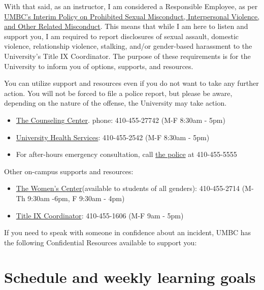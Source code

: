 \documentclass[11pt]{article}
\begin{document}
With that said, as an instructor, I am considered a Responsible Employee, as per \href{https://oei.umbc.edu/umbcs-policy-on-prohibited-sexual-misconduct-interpersonal-violence-and-other-related-misconduct/}{UMBC's Interim Policy on Prohibited Sexual Misconduct, Interpersonal Violence, and Other Related Misconduct}. This means that while I am here to listen and support you, I am required to report disclosures of sexual assault, domestic violence, relationship violence, stalking, and/or gender-based harassment to the University's Title IX Coordinator. The purpose of these requirements is for the University to inform you of options, supports, and resources.

You can utilize support and resources even if you do not want to take any further action. You will not be forced to file a police report, but please be aware, depending on the nature of the offense, the University may take action.
\begin{itemize}
	\item \href{https://counseling.umbc.edu/}{The Counseling Center}. phone: 410-455-27742 (M-F 8:30am - 5pm)
	\item \href{https://uhs.umbc.edu/}{University Health Services}: 410-455-2542 (M-F 8:30am - 5pm)
	\item For after-hours emergency consultation, call \href{https://police.umbc.edu/}{the police} at 410-455-5555
\end{itemize}

Other on-campus supports and resources:

\begin{itemize}
	\item \href{https://womenscenter.umbc.edu/}{The Women's Center}(available to students of all genders): 410-455-2714 (M-Th 9:30am -6pm, F 9:30am - 4pm)
	\item \href{https://oei.umbc.edu/sexual-misconduct-policy-and-procedures/}{Title IX Coordinator}: 410-455-1606 (M-F 9am - 5pm)
\end{itemize}
If you need to speak with someone in confidence about an incident, UMBC has the following Confidential Resources available to support you:



\newpage
\section*{Schedule and weekly learning goals}
\end{document}

